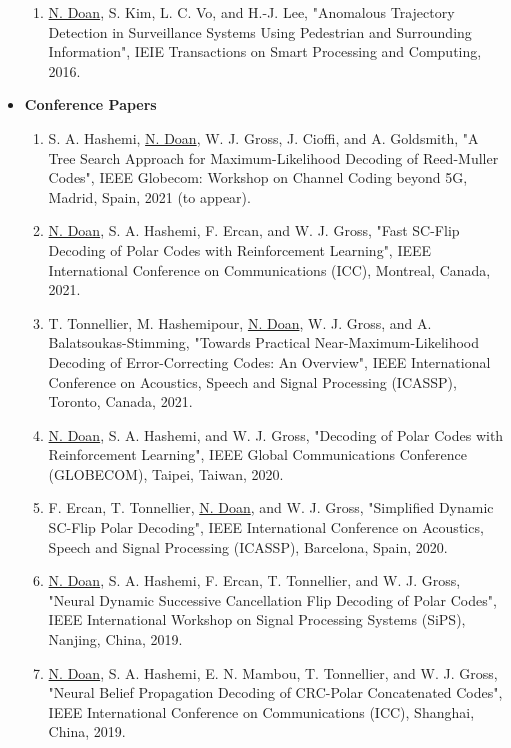 \documentclass[10pt]{article}
\begin{document}
\begin{itemize}
\begin{enumerate}
			\item \underline{N. Doan}, S. Kim, L. C. Vo, and H.-J. Lee, "Anomalous Trajectory Detection in Surveillance Systems Using Pedestrian and Surrounding Information", IEIE Transactions on Smart Processing and Computing, 2016.
		\end{enumerate}
	  
		\item[]\textbf{Conference Papers}
		\begin{enumerate}
			\item S. A. Hashemi, \underline{N. Doan}, W. J. Gross, J. Cioffi, and A. Goldsmith, "A Tree Search Approach for Maximum-Likelihood Decoding of Reed-Muller Codes", IEEE Globecom: Workshop on Channel Coding beyond 5G, Madrid, Spain, 2021 (to appear).
						
			\item \underline{N. Doan}, S. A. Hashemi, F. Ercan, and W. J. Gross, "Fast SC-Flip Decoding of Polar Codes with Reinforcement Learning", IEEE International Conference on Communications (ICC), Montreal, Canada, 2021.
			
			\item T. Tonnellier, M. Hashemipour, \underline{N. Doan}, W. J. Gross, and A. Balatsoukas-Stimming, "Towards Practical Near-Maximum-Likelihood Decoding of Error-Correcting Codes: An Overview", IEEE International Conference on Acoustics, Speech and Signal Processing (ICASSP), Toronto, Canada, 2021.
			
			\item \underline{N. Doan}, S. A. Hashemi, and W. J. Gross, "Decoding of Polar Codes with Reinforcement Learning", IEEE Global Communications Conference (GLOBECOM), Taipei, Taiwan, 2020.
			
			\item F. Ercan, T. Tonnellier, \underline{N. Doan}, and W. J. Gross, "Simplified Dynamic SC-Flip Polar Decoding", IEEE International Conference on Acoustics, Speech and Signal Processing (ICASSP), Barcelona, Spain, 2020.
			
			\item \underline{N. Doan}, S. A. Hashemi, F. Ercan, T. Tonnellier, and W. J. Gross, "Neural Dynamic Successive Cancellation Flip Decoding of Polar Codes", IEEE International Workshop on Signal Processing Systems (SiPS), Nanjing, China, 2019.

			\item \underline{N. Doan}, S. A. Hashemi, E. N. Mambou, T. Tonnellier, and W. J. Gross, "Neural Belief Propagation Decoding of CRC-Polar Concatenated Codes", IEEE International Conference on Communications (ICC), Shanghai, China, 2019.			
			

\end{enumerate}
\end{itemize}
\end{document}
